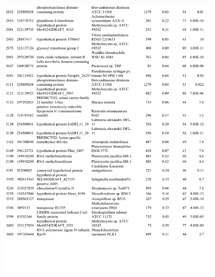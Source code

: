\begin{figure}[H]
\centering
    \includegraphics[width=1.0\textwidth]{./tex/chapter1/figures/supplemental/TableS1e.pdf}
\end{figure}
